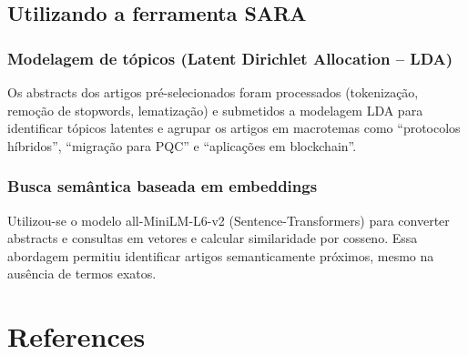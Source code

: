\documentclass{siintec}
\begin{document}
\subsection{Utilizando a ferramenta SARA}
\subsubsection{Modelagem de tópicos (Latent Dirichlet Allocation – LDA)}
Os abstracts dos artigos pré-selecionados foram processados (tokenização, remoção de stopwords, lematização) e submetidos a modelagem LDA para identificar tópicos latentes e agrupar os artigos em macrotemas como “protocolos híbridos”, “migração para PQC” e “aplicações em blockchain”.

\subsubsection{Busca semântica baseada em embeddings}
Utilizou-se o modelo all-MiniLM-L6-v2 (Sentence-Transformers) para converter abstracts e consultas em vetores e calcular similaridade por cosseno. Essa abordagem permitiu identificar artigos semanticamente próximos, mesmo na ausência de termos exatos.




\section*{References}

\end{document}
